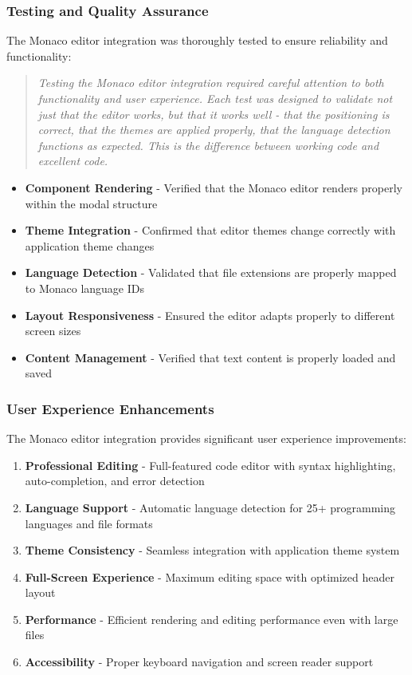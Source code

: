 \documentclass[11pt]{article}
\begin{document}
\subsubsection{Testing and Quality Assurance}

The Monaco editor integration was thoroughly tested to ensure reliability and functionality:

\begin{quote}
\emph{Testing the Monaco editor integration required careful attention to both functionality and user experience. Each test was designed to validate not just that the editor works, but that it works well - that the positioning is correct, that the themes are applied properly, that the language detection functions as expected. This is the difference between working code and excellent code.}
\end{quote}

\begin{itemize}
\item \textbf{Component Rendering} - Verified that the Monaco editor renders properly within the modal structure
\item \textbf{Theme Integration} - Confirmed that editor themes change correctly with application theme changes
\item \textbf{Language Detection} - Validated that file extensions are properly mapped to Monaco language IDs
\item \textbf{Layout Responsiveness} - Ensured the editor adapts properly to different screen sizes
\item \textbf{Content Management} - Verified that text content is properly loaded and saved
\end{itemize}

\subsubsection{User Experience Enhancements}

The Monaco editor integration provides significant user experience improvements:

\begin{enumerate}
\item \textbf{Professional Editing} - Full-featured code editor with syntax highlighting, auto-completion, and error detection
\item \textbf{Language Support} - Automatic language detection for 25+ programming languages and file formats
\item \textbf{Theme Consistency} - Seamless integration with application theme system
\item \textbf{Full-Screen Experience} - Maximum editing space with optimized header layout
\item \textbf{Performance} - Efficient rendering and editing performance even with large files
\item \textbf{Accessibility} - Proper keyboard navigation and screen reader support
\end{enumerate}
\end{document}
